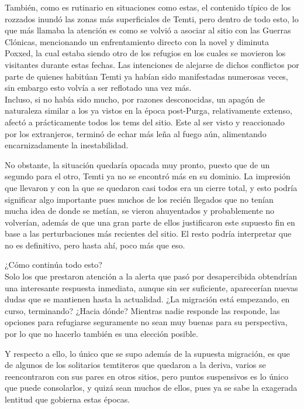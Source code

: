 \documentclass[
  spanish,
]{book}
\begin{document}
También, como es rutinario en situaciones como estas, el contenido típico de los rozzados inundó las zonas más superficiales de Temti, pero dentro de todo esto, lo que más llamaba la atención es como se volvió a asociar al sitio con las Guerras Clónicas, mencionando un enfrentamiento directo con la novel y diminuta Poxxed, la cual estaba siendo otro de los refugios en los cuales se movieron los visitantes durante estas fechas. Las intenciones de alejarse de dichos conflictos por parte de quienes habitúan Temti ya habían sido manifestadas numerosas veces, sin embargo esto volvía a ser reflotado una vez más.\\
Incluso, si no había sido mucho, por razones desconocidas, un apagón de naturaleza similar a los ya vistos en la época post-Purga, relativamente extenso, afectó a prácticamente todos los tems del sitio. Este al ser visto y reaccionado por los extranjeros, terminó de echar más leña al fuego aún, alimentando encarnizadamente la inestabilidad.

No obstante, la situación quedaría opacada muy pronto, puesto que de un segundo para el otro, Temti ya no se encontró más en su dominio. La impresión que llevaron y con la que se quedaron casi todos era un cierre total, y esto podría significar algo importante pues muchos de los recién llegados que no tenían mucha idea de donde se metían, se vieron ahuyentados y probablemente no volverían, además de que una gran parte de ellos justificaron este supuesto fin en base a las perturbaciones más recientes del sitio. El resto podría interpretar que no es definitivo, pero hasta ahí, poco más que eso.

¿Cómo continúa todo esto?\\
Solo los que prestaron atención a la alerta que pasó por desapercibida obtendrían una interesante respuesta inmediata, aunque sin ser suficiente, aparecerían nuevas dudas que se mantienen hasta la actualidad. ¿La migración está empezando, en curso, terminando? ¿Hacia dónde? Mientras nadie responde las responde, las opciones para refugiarse seguramente no sean muy buenas para su perspectiva, por lo que no hacerlo también es una elección posible.

Y respecto a ello, lo único que se supo además de la supuesta migración, es que de algunos de los solitarios temtiteros que quedaron a la deriva, varios se reencontraron con sus pares en otros sitios, pero puntos suspensivos es lo único que puede consolarlos, y quizá sean muchos de ellos, pues ya se sabe la exagerada lentitud que gobierna estas épocas.
\end{document}
